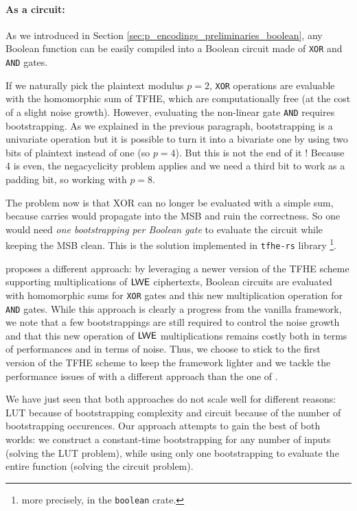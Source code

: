\paragraph{As a circuit:}

As we introduced in Section \ref{sec:p_encodings_preliminaries_boolean}, any Boolean function can be easily compiled into a Boolean circuit made of \texttt{XOR} and \texttt{AND} gates. 

If we naturally pick the plaintext modulus $p=2$, \texttt{XOR} operations are evaluable with the homomorphic sum of TFHE, which are computationally free (at the cost of a slight noise growth). However, evaluating the non-linear gate \texttt{AND} requires bootstrapping. As we explained in the previous paragraph, bootstrapping is a univariate operation but it is possible to turn it into a bivariate one by using two bits of plaintext instead of one (so $p=4$). But this is not the end of it ! Because 4 is even, the negacyclicity problem applies and we need a third bit to work as a padding bit, so working with $p=8$.

The problem now is that XOR can no longer be evaluated with a simple sum, because carries would propagate into the MSB and ruin the correctness. So one would need \textit{one bootstrapping per Boolean gate} to evaluate the circuit while keeping the MSB clean. This is the solution implemented in \texttt{tfhe-rs} library \cite{tfhe-rs}\footnote{more precisely, in the \texttt{boolean} crate.}. 


\cite{AC:CLOT21} proposes a different approach: by leveraging a newer version of the TFHE scheme supporting multiplications of $\textsf{LWE}$ ciphertexts, Boolean circuits are evaluated with homomorphic sums for \texttt{XOR} gates and this new multiplication operation for \texttt{AND} gates. While this approach is clearly a progress from the vanilla framework, we note that a few bootstrappings are still required to control the noise growth and that this new operation of $\textsf{LWE}$ multiplications remains costly both in terms of performances and in terms of noise. Thus, we choose to stick to the first version of the TFHE scheme to keep the framework lighter and we tackle the performance issues of \cite{JC:CGGI20} with a different approach than the one of \cite{AC:CLOT21}.

\bigskip

We have just seen that both approaches do not scale well for different reasons: LUT because of bootstrapping complexity and circuit because of the number of bootstrapping occurences. Our approach attempts to gain the best of both worlds: we construct a constant-time bootstrapping for any number of inputs (solving the LUT problem), while using only one bootstrapping to evaluate the entire function (solving the circuit problem).

